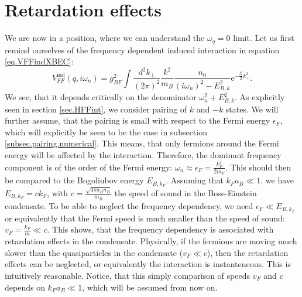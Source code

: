 \section{Retardation effects} \label{sec.RetardationEffects}
We are now in a position, where we can understand the $\omega_q = 0$ limit. Let us first remind ourselves of the frequency dependent induced interaction in equation \eqref{eq.VFFindXBEC}:
\begin{equation}
V_{FF}^\text{ind}(q,i\omega_n) = g_{BF}^2\int\frac{d^2k_\perp}{(2\pi)^2}\frac{k^2}{m_B}\frac{n_0}{(i\omega_n)^2-E_{B,k}^2}\text{e}^{-\frac{l_t^2}{2}k_\perp^2}. \nonumber
\end{equation}
We see, that it depends critically on the denominator $\omega_n^2+E_{B,k}^2$. As explicitly seen in section \ref{sec.HFFint}, we consider pairing of $k$ and $-k$ states. We will further assume, that the pairing is small with respect to the Fermi energy $\epsilon_F$, which will explicitly be seen to be the case in subsection \ref{subsec.pairing.numerical}. This means, that only fermions around the Fermi energy will be affected by the interaction. Therefore, the dominant frequency component is of the order of the Fermi energy: $\omega_n \approx \epsilon_F = \frac{k_F^2}{2m_F}$. This should then be compared to the Bogoliubov energy $E_{B,k_F}$. Assuming that $k_Fa_B\ll 1$, we have $E_{B,k_F} = ck_F$, with $c =\frac{\sqrt{4\pi a_B n_B}}{m_B}$ the speed of sound in the Bose-Einstein condensate. To be able to neglect the frequency dependency, we need $\epsilon_F \ll E_{B,k_F}$ or equivalently that the Fermi speed is much smaller than the speed of sound: $v_F = \frac{k_F}{m}\ll c$. This shows, that the frequency dependency is associated with retardation effects in the condensate. Physically, if the fermions are moving much slower than the quasiparticles in the condensate ($v_F \ll c$), then the retardation effects can be neglected, or equivalently the interaction is instanteneous. This is intuitively reasonable. Notice, that this simply comparison of speeds $v_F$ and $c$ depends on $k_Fa_B\ll 1$, which will be assumed from now on.

